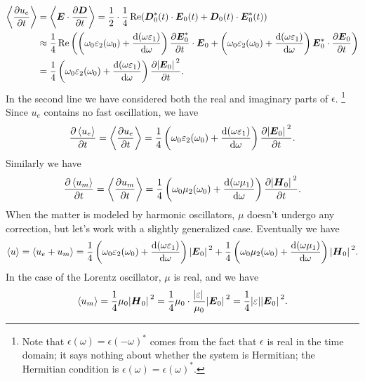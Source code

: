 \documentclass[hyperref, a4paper]{article}
\begin{document}
\begin{equation}
    \begin{aligned}
        \expval{\pdv{u_e}{t}} &= \expval{\vb*{E} \cdot \pdv{\vb*{D}}{t}}
        = \frac{1}{2} \cdot \frac{1}{4} \Re (
            \vb*{D}_0^*(t) \cdot \vb*{E}_0(t)
            + \vb*{D}_0(t) \cdot \vb*{E}_0^*(t)
        ) \\
        &\approx \frac{1}{4} \Re \left(
            \left(
                \omega_0 \varepsilon_2(\omega_0) 
                + \dv{(\omega \varepsilon_1)}{\omega} 
            \right)
                \pdv{\vb*{E}_0^*}{t} \cdot \vb*{E}_0 
            + \left(
                \omega_0 \varepsilon_2(\omega_0)
                + \dv{(\omega \varepsilon_1)}{\omega} 
            \right)
            \vb*{E}_0^* \cdot \pdv{\vb*{E}_0}{t} 
        \right) \\
        &= \frac{1}{4} \left(
            \omega_0 \varepsilon_2(\omega_0) +
            \dv{(\omega \varepsilon_1)}{\omega}
        \right) \pdv{\abs*{\vb*{E}_0}^2}{t} .
    \end{aligned}
\end{equation}
In the second line we have considered 
both the real and imaginary parts of $\epsilon$.%
\footnote{
    Note that $\epsilon(\omega) = \epsilon(- \omega)^*$
    comes from the fact that $\epsilon$ is real in the time domain;
    it says nothing about whether the system is Hermitian;
    the Hermitian condition is $\epsilon(\omega) = \epsilon(\omega)^*$.
} 
Since $u_e$ contains no fast oscillation, we have 
\begin{equation}
    \pdv{\expval{u_e}}{t} = \expval{\pdv{u_e}{t}} 
    = \frac{1}{4} \left(
        \omega_0 \varepsilon_2(\omega_0) +
        \dv{(\omega \varepsilon_1)}{\omega}
    \right)  
    \pdv{\abs*{\vb*{E}_0}^2}{t} .
\end{equation}
Similarly we have 
\begin{equation}
    \pdv{\expval{u_m}}{t} = \expval{\pdv{u_m}{t}} 
    = \frac{1}{4} \left(
        \omega_0 \mu_2(\omega_0) +
        \dv{(\omega \mu_1)}{\omega}
    \right) 
    \pdv{\abs*{\vb*{H}_0}^2}{t} .
\end{equation}
When the matter is modeled by harmonic oscillators, 
$\mu$ doesn't undergo any correction, 
but let's work with a slightly generalized case.
Eventually we have 
\begin{equation}
    \expval{u} = \expval{u_e + u_m} 
    = \frac{1}{4} \left(
        \omega_0 \varepsilon_2(\omega_0) +
        \dv{(\omega \varepsilon_1)}{\omega}
    \right)  
    \abs*{\vb*{E}_0}^2 + 
    \frac{1}{4} \left(
        \omega_0 \mu_2(\omega_0) +
        \dv{(\omega \mu_1)}{\omega}
    \right) 
    \abs*{\vb*{H}_0}^2.
\end{equation}
In the case of the Lorentz oscillator,
$\mu$ is real, and we have 
\begin{equation}
    \expval{u_m} = \frac{1}{4} \mu_0 \abs*{\vb*{H}_0}^2 
    = \frac{1}{4} \mu_0 \cdot \frac{\abs*{\varepsilon}}{\mu_0} \abs*{\vb*{E}_0}^2
    = \frac{1}{4} \abs{\varepsilon} \abs*{\vb*{E}_0}^2.
\end{equation}
\end{document}
